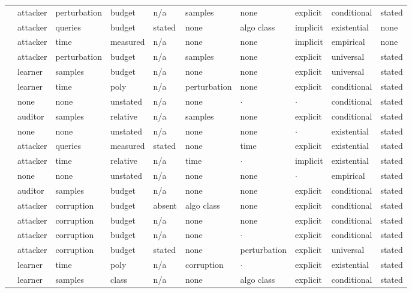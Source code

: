 \begin{landscape}
\begin{longtable}{rlllllllll}
\cite{SWKBC25} & attacker & perturbation & budget & n/a & samples & none & explicit & conditional & stated \\
\cite{FK24} & attacker & queries & budget & stated & none & algo class & implicit & existential & none \\
\cite{SSZHTE24} & attacker & time & measured & n/a & none & none & implicit & empirical & none \\
\cite{APU25} & attacker & perturbation & budget & n/a & samples & none & explicit & universal & stated \\
\cite{MHS19} & learner & samples & budget & n/a & none & none & explicit & universal & stated \\
\cite{DNV19} & learner & time & poly & n/a & perturbation & none & explicit & conditional & stated \\
\cite{Sha23} & none & none & unstated & n/a & none & $\cdot$ & $\cdot$ & conditional & stated \\
\cite{NK26} & auditor & samples & relative & n/a & samples & none & explicit & conditional & stated \\
\cite{RCA24} & none & none & unstated & n/a & none & none & $\cdot$ & existential & stated \\
\cite{CGZ24} & attacker & queries & measured & stated & none & time & explicit & existential & stated \\
\cite{ZCSL24} & attacker & time & relative & n/a & time & $\cdot$ & implicit & existential & stated \\
\cite{DSFHCFKSTT25} & none & none & unstated & n/a & none & none & $\cdot$ & empirical & stated \\
\cite{ZYWGW25} & auditor & samples & budget & n/a & none & none & explicit & conditional & stated \\
\cite{SKL17} & attacker & corruption & budget & absent & algo class & none & explicit & conditional & stated \\
\cite{LXSWLGZX25} & attacker & corruption & budget & n/a & none & none & explicit & conditional & stated \\
\cite{LCMER25} & attacker & corruption & budget & n/a & none & $\cdot$ & explicit & conditional & stated \\
\cite{MMM19} & attacker & corruption & budget & stated & none & perturbation & explicit & universal & stated \\
\cite{DKKLMS16} & learner & time & poly & n/a & corruption & $\cdot$ & explicit & existential & stated \\
\cite{DIKR25} & learner & samples & class & n/a & none & algo class & explicit & conditional & stated \\

\end{longtable}
\end{landscape}
